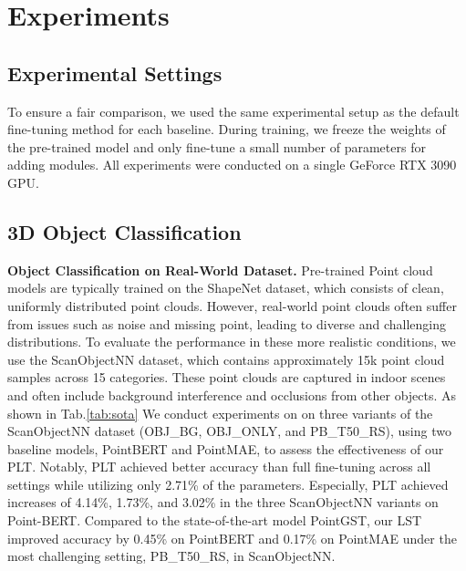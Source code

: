 \section{Experiments}
\label{sec:experiments}

\subsection{Experimental Settings}
To ensure a fair comparison, we used the same experimental setup as the default fine-tuning method\cite{zha2023instance, zhou2024dynamic} for each baseline. During training, we freeze the weights of the pre-trained model and only fine-tune a small number of parameters for adding modules. All experiments were conducted on a single GeForce RTX 3090 GPU.



\subsection{3D Object Classification}
\textbf{Object Classification on Real-World Dataset.} Pre-trained Point cloud models are typically trained on the ShapeNet dataset\cite{chang2015shapenet}, which consists of clean, uniformly distributed point clouds. However, real-world point clouds often suffer from issues such as noise and missing point, leading to diverse and challenging distributions. To evaluate the performance in these more realistic conditions, we use the ScanObjectNN dataset\cite{uy2019revisiting}, which contains approximately 15k point cloud samples across 15 categories. These point clouds are captured in indoor scenes and often include background interference and occlusions from other objects. As shown in Tab.\ref{tab:sota} We conduct experiments on on three variants of the ScanObjectNN dataset\cite{uy2019revisiting} (OBJ\_BG, OBJ\_ONLY, and PB\_T50\_RS), using two baseline models, PointBERT\cite{yu2022point} and PointMAE\cite{pang2022masked}, to assess the effectiveness of our PLT. Notably, PLT achieved better accuracy than full fine-tuning across all settings while utilizing only 2.71\% of the parameters. Especially, PLT achieved increases of 4.14\%, 1.73\%, and 3.02\% in the three ScanObjectNN\cite{uy2019revisiting} variants on Point-BERT. Compared to the state-of-the-art model PointGST, our LST improved accuracy by 0.45\% on PointBERT\cite{yu2022point} and 0.17\% on PointMAE\cite{pang2022masked} under the most challenging setting, PB\_T50\_RS, in ScanObjectNN\cite{uy2019revisiting}.

